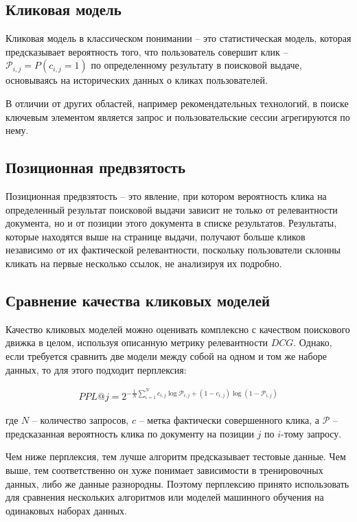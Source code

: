 \documentclass[diploma]{nanolab2015}
\begin{document}
\subsection{Кликовая модель}
Кликовая модель в классическом понимании -- это статистическая модель, которая предсказывает вероятность того, что пользователь совершит клик -- $\mathcal{P}_{i,j} = P(c_{i,j} = 1)$ по определенному результату в поисковой выдаче, основываясь на исторических данных о кликах пользователей.

В отличии от других областей, например рекомендательных технологий, в поиске ключевым элементом является запрос и пользовательские сессии агрегируются по нему.

\subsection{Позиционная предвзятость}
Позиционная предвзятость -- это явление, при котором вероятность клика на определенный результат поисковой выдачи зависит не только от релевантности документа, но и от позиции этого документа в списке результатов. Результаты, которые находятся выше на странице выдачи, получают больше кликов независимо от их фактической релевантности, поскольку пользователи склонны кликать на первые несколько ссылок, не анализируя их подробно.


\subsection{Сравнение качества кликовых моделей}
Качество кликовых моделей можно оценивать комплексно с качеством поискового движка в целом, используя описанную метрику релевантности $DCG$. Однако, если требуется сравнить две модели между собой на одном и том же наборе данных, то для этого подходит перплексия:

\begin{align}
    PPL@j = 2^{-\frac{1}{N}\sum_{i=1}^{N}c_{i,j}\log\mathcal{P}_{i,j} + (1 - c_{i,j})\log(1 - \mathcal{P}_{i,j}) }
\end{align}

где $N$ -- количество запросов, $c$ -- метка фактически совершенного клика, а $\mathcal{P}$ -- предсказанная вероятность клика по документу на позиции $j$ по $i$-тому запросу.

Чем ниже перплексия, тем лучше алгоритм предсказывает тестовые данные. Чем выше, тем соответственно он хуже понимает зависимости в тренировочных данных, либо же данные разнородны. Поэтому перплексию принято использовать для сравнения нескольких алгоритмов или моделей машинного обучения на одинаковых наборах данных.
\end{document}
